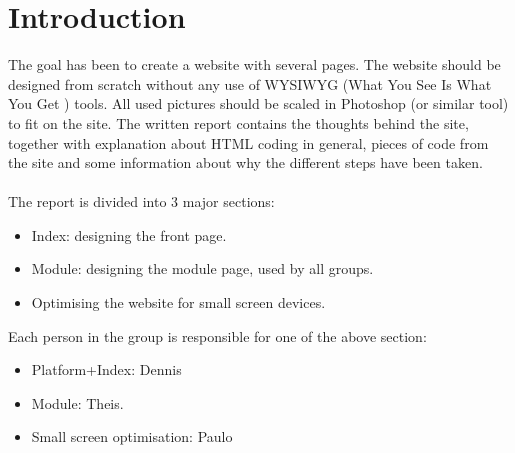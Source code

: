 \chapter{Introduction}
The goal has been to create a website with several pages. The website should be designed from scratch without any use of WYSIWYG (What You See Is What You Get ) tools. All used pictures should be scaled in Photoshop (or similar tool) to fit on the site. The written report contains the thoughts behind the site, together with explanation about HTML coding in general, pieces of code from the site and some information about why the different steps have been taken. \\
\\
The report is divided into 3 major sections:
\begin{itemize}
	\item Index: designing the front page.
	\item Module: designing the module page, used by all groups.
	\item Optimising the website for small screen devices.
\end{itemize}
Each person in the group is responsible for one of the above section:
\begin{itemize}
	\item Platform+Index: Dennis
	\item Module: Theis.
	\item Small screen optimisation: Paulo
\end{itemize}
